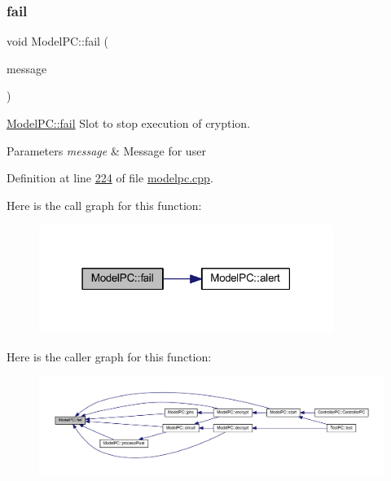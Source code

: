 \subsubsection{\texorpdfstring{fail}{fail}}
{\footnotesize\ttfamily void Model\+P\+C\+::fail (\begin{DoxyParamCaption}\item[{Q\+String}]{message }\end{DoxyParamCaption})\hspace{0.3cm}{\ttfamily [slot]}}



\mbox{\hyperlink{class_model_p_c_a47464b59b7e37fcee25e55475708aabd}{Model\+P\+C\+::fail}} Slot to stop execution of cryption. 


\begin{DoxyParams}{Parameters}
{\em message} & Message for user \\
\hline
\end{DoxyParams}


Definition at line \mbox{\hyperlink{modelpc_8cpp_source_l00224}{224}} of file \mbox{\hyperlink{modelpc_8cpp_source}{modelpc.\+cpp}}.

Here is the call graph for this function\+:
\nopagebreak
\begin{figure}[H]
\begin{center}
\leavevmode
\includegraphics[width=271pt]{class_model_p_c_a47464b59b7e37fcee25e55475708aabd_cgraph}
\end{center}
\end{figure}
Here is the caller graph for this function\+:
\nopagebreak
\begin{figure}[H]
\begin{center}
\leavevmode
\includegraphics[width=350pt]{class_model_p_c_a47464b59b7e37fcee25e55475708aabd_icgraph}
\end{center}
\end{figure}
\mbox{\label{class_model_p_c_a8bee0255c09449868c7e6097afaaf0cd}} 
